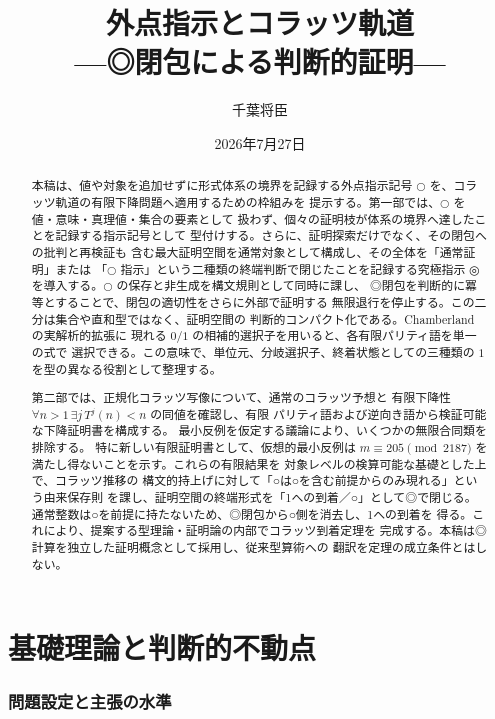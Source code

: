 \documentclass[a4paper,11pt]{ltjsarticle}
\title{外点指示とコラッツ軌道\\
{\large ---◎閉包による判断的証明---}}
\author{千葉将臣}
\date{2026年7月27日}
\theoremstyle{definition}
\theoremstyle{plain}
\newcommand{\dfix}{\mathord{\text{○}}}
\newcommand{\udfix}{\mathord{\text{◎}}}
\newcommand{\1}{\mathbf{1}}
\begin{document}
\maketitle

\begin{abstract}
本稿は、値や対象を追加せずに形式体系の境界を記録する外点指示記号
$\dfix$ を、コラッツ軌道の有限下降問題へ適用するための枠組みを
提示する。第一部では、$\dfix$ を値・意味・真理値・集合の要素として
扱わず、個々の証明枝が体系の境界へ達したことを記録する指示記号として
型付けする。さらに、証明探索だけでなく、その閉包への批判と再検証も
含む最大証明空間を通常対象として構成し、その全体を「通常証明」または
「$\dfix$ 指示」という二種類の終端判断で閉じたことを記録する究極指示
$\udfix$ を導入する。$\dfix$ の保存と非生成を構文規則として同時に課し、
◎閉包を判断的に冪等とすることで、閉包の適切性をさらに外部で証明する
無限退行を停止する。この二分は集合や直和型ではなく、証明空間の
判断的コンパクト化である。Chamberland の実解析的拡張に
現れる $0/1$ の相補的選択子を用いると、各有限パリティ語を単一の式で
選択できる。この意味で、単位元、分岐選択子、終着状態としての三種類の
$1$ を型の異なる役割として整理する。

第二部では、正規化コラッツ写像について、通常のコラッツ予想と
有限下降性 $\forall n>1\,\exists j\,T^j(n)<n$ の同値を確認し、有限
パリティ語および逆向き語から検証可能な下降証明書を構成する。
最小反例を仮定する議論により、いくつかの無限合同類を排除する。
特に新しい有限証明書として、仮想的最小反例は
$m\equiv205\pmod{2187}$ を満たし得ないことを示す。これらの有限結果を
対象レベルの検算可能な基礎とした上で、コラッツ推移の
構文的持上げに対して「○は○を含む前提からのみ現れる」という由来保存則
を課し、証明空間の終端形式を「1への到着／○」として◎で閉じる。
通常整数は○を前提に持たないため、◎閉包から○側を消去し、1への到着を
得る。これにより、提案する型理論・証明論の内部でコラッツ到着定理を
完成する。本稿は◎計算を独立した証明概念として採用し、従来型算術への
翻訳を定理の成立条件とはしない。
\end{abstract}

\tableofcontents

\part{基礎理論と判断的不動点}

\section{問題設定と主張の水準}
\end{document}
